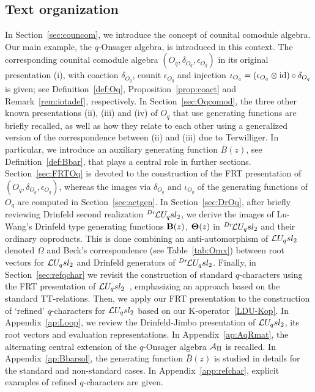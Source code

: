 \documentclass[11pt]{amsart}
\numberwithin{equation}{section}
\numberwithin{equation}{section}
\begin{document}
\subsection{Text organization} In Section~\ref{sec:councom}, we introduce the concept of counital comodule algebra. Our main example, the $q$-Onsager algebra, is introduced in this context. The corresponding counital comodule algebra $(O_q,\delta_{O_q},\epsilon_{O_q})$ in its original presentation (i), with coaction $\delta_{O_q}$, counit $\epsilon_{O_q}$ and injection $\iota_{O_q}=(\epsilon_{O_q}\otimes \mathrm{id})\circ \delta_{O_q}$ is given; see Definition~\ref{def:Oq}, Proposition~\ref{prop:coact} and Remark~\ref{rem:iotadef}, respectively.
In Section~\ref{sec:Oqcomod}, the three other known presentations (ii), (iii) and (iv) of $O_q$ that use generating functions are briefly recalled, as well as how they relate to each other using a generalized version of the correspondence between (ii) and (iii) due to Terwilliger. In particular, we introduce an auxiliary generating function $\bar B(z)$, see Definition~\ref{def:Bbar}, that plays a central role in further sections.
Section~\ref{sec:FRTOq} is devoted to the construction of the FRT presentation of $(O_q,\delta_{O_q},\epsilon_{O_q})$, whereas the images via $\delta_{O_q}$ and $\iota_{O_q}$ of the generating functions of $O_q$ are computed in Section~\ref{sec:actgen}. In Section~\ref{sec:DrOq}, after briefly reviewing Drinfeld second realization ${}^{Dr}\!\mathcal{L} U_q sl_2$,  we derive the images of Lu-Wang's Drinfeld type generating functions ${\bf B}(z)$, ${\bf \Theta}(z)$  in ${}^{Dr}\!\mathcal{L} U_q sl_2$ and their ordinary coproducts. This is done combining an anti-automorphism of $\mathcal{L} U_q sl_2$ denoted $\Omega$ and Beck's correspondence (see Table~\ref{tab:Omx}) between root vectors for $\mathcal{L} U_q sl_2$ and Drinfeld generators of ${}^{Dr}\!\mathcal{L} U_q sl_2$.  Finally, in Section~\ref{sec:refqchar} we revisit the construction of standard $q$-characters using the FRT presentation of $\mathcal{L} U_q sl_2$~\cite{FR99,FMu99}, emphasizing an approach based on the standard TT-relations. Then, we apply our FRT presentation to the construction of `refined' $q$-characters for $\mathcal{L} U_q sl_2$ based on our K-operator~\eqref{LDU-Kop}.
 In Appendix~\ref{ap:Loop}, we review the Drinfeld-Jimbo presentation of $\mathcal{L} U_q sl_2$, its root vectors and evaluation representations.
In Appendix~\ref{ap:AqRmat}, the alternating central extension of the $q$-Onsager algebra $\cal A_q$ is recalled.  In Appendix~\ref{ap:Bbarsol}, the generating function $\bar B(z)$ is studied in details for the standard and non-standard cases. In Appendix~\ref{app:refchar}, explicit examples of refined $q$-characters are given.
\end{document}
